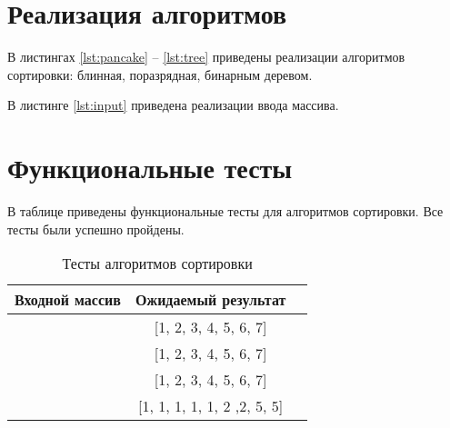 \section{Реализация алгоритмов}

В листингах \ref{lst:pancake} -- \ref{lst:tree} приведены реализации алгоритмов сортировки: блинная, поразрядная, бинарным деревом.

В листинге \ref{lst:input} приведена реализации ввода массива.

\clearpage




\clearpage



\clearpage


\clearpage


\clearpage


\clearpage


\clearpage

\clearpage

\section{Функциональные тесты}

В таблице приведены функциональные тесты для алгоритмов сортировки. 
Все тесты были успешно пройдены.

\begin{table}[h]
	\centering
	\small
	\caption{Тесты алгоритмов сортировки}
	\begin{tabular}{|c|c|c|}
	\hline
	\textbf{Входной массив} & \textbf{Ожидаемый результат} \\
	\hline
	[1, 2, 3, 4, 5, 6, 7] &
	[1, 2, 3, 4, 5, 6, 7]
	\\
	\hline
	[7, 6, 5, 4, 3, 2, 1]&
	[1, 2, 3, 4, 5, 6, 7] 
	\\
	\hline
	[1, 5, 3, 7, 6, 2, 4]&
	[1, 2, 3, 4, 5, 6, 7] 
	\\
	\hline
	[1, 1, 1, 1, 5, 5, 1, 2, 2]&
	[1, 1, 1, 1, 1, 2 ,2, 5, 5]
	\\
	\hline
	\end{tabular}
	\end{table}
	
